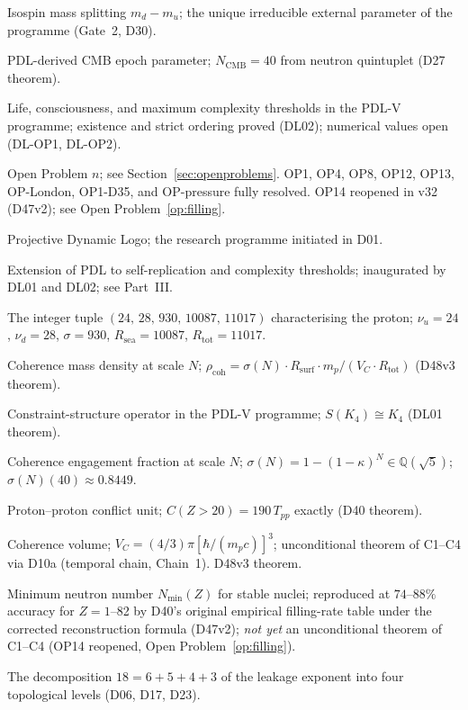 \documentclass[11pt,a4paper]{article}
\theoremstyle{plain}
\theoremstyle{definition}
\theoremstyle{remark}
\newcommand{\quintuplet}{(24,\,28,\,930,\,10087,\,11017)}
\newcommand{\Rsurf}{R_{\mathrm{surf}}}
\newcommand{\Rtot}{R_{\mathrm{tot}}}
\newcommand{\sigmaN}{\sigma(N)}
\newcommand{\Tpp}{T_{pp}}
\newcommand{\rhocoh}{\rho_{\mathrm{coh}}}
\begin{document}
\begin{description}[leftmargin=3.5cm, style=nextline]
\item[$m_{\mathrm{iso}}$] Isospin mass splitting $m_d-m_u$; the unique irreducible external parameter of the programme (Gate~2, D30).
\item[$N_{\mathrm{CMB}}$] PDL-derived CMB epoch parameter; $N_{\mathrm{CMB}}=40$ from neutron quintuplet (D27 theorem).
\item[$n^*_{\mathrm{life}}$, $n^*_{\mathrm{consciousness}}$, $n^*_{\mathrm{max}}$] Life, consciousness, and maximum complexity thresholds in the PDL-V programme; existence and strict ordering proved (DL02); numerical values open (DL-OP1, DL-OP2).
\item[OP$n$] Open Problem $n$; see Section~\ref{sec:openproblems}. OP1, OP4, OP8, OP12, OP13, OP-London, OP1-D35, and OP-pressure fully resolved. OP14 reopened in v32 (D47v2); see Open Problem~\ref{op:filling}.
\item[PDL] Projective Dynamic Logo; the research programme initiated in D01.
\item[PDL-V programme] Extension of PDL to self-replication and complexity thresholds; inaugurated by DL01 and DL02; see Part~III.
\item[Quintuplet] The integer tuple $\quintuplet$ characterising the proton; $\nu_u=24$, $\nu_d=28$, $\sigma=930$, $R_{\mathrm{sea}}=10087$, $R_{\mathrm{tot}}=11017$.
\item[$\rhocoh(N)$] Coherence mass density at scale $N$; $\rhocoh = \sigmaN\cdot\Rsurf\cdot m_p/(V_C\cdot\Rtot)$ (D48v3 theorem).
\item[$S(\Gamma)$] Constraint-structure operator in the PDL-V programme; $S(K_4) \cong K_4$ (DL01 theorem).
\item[$\sigmaN(N)$] Coherence engagement fraction at scale $N$; $\sigmaN=1-(1-\kappa)^N\in\mathbb{Q}(\sqrt{5})$; $\sigmaN(40)\approx 0.8449$.
\item[$\Tpp$] Proton--proton conflict unit; $C(Z>20)=190\,\Tpp$ exactly (D40 theorem).
\item[$V_C$] Coherence volume; $V_C=(4/3)\pi[\hbar/(m_pc)]^3$; unconditional theorem of C1--C4 via D10a (temporal chain, Chain~1). D48v3 theorem.
\item[Valley of stability] Minimum neutron number $N_{\min}(Z)$ for stable nuclei; reproduced at $74$--$88\%$ accuracy for $Z=1$--82 by D40's original empirical filling-rate table under the corrected reconstruction formula (D47v2); \emph{not yet} an unconditional theorem of C1--C4 (OP14 reopened, Open Problem~\ref{op:filling}).
\item[18-filter hierarchy] The decomposition $18=6+5+4+3$ of the leakage exponent into four topological levels (D06, D17, D23).
\end{description}
\end{document}
